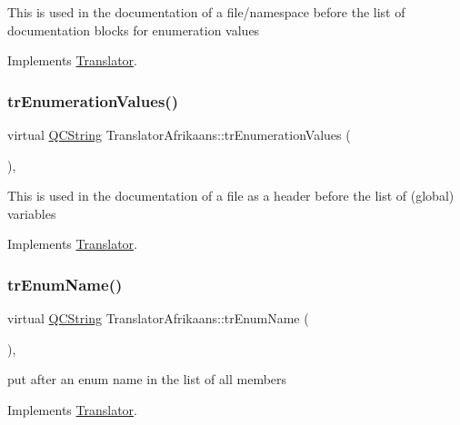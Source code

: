 This is used in the documentation of a file/namespace before the list of documentation blocks for enumeration values 

Implements \mbox{\hyperlink{class_translator}{Translator}}.

\mbox{\label{class_translator_afrikaans_a166b606d30663510308f54a4270107b7}} 
\subsubsection{\texorpdfstring{trEnumerationValues()}{trEnumerationValues()}}
{\footnotesize\ttfamily virtual \mbox{\hyperlink{class_q_c_string}{Q\+C\+String}} Translator\+Afrikaans\+::tr\+Enumeration\+Values (\begin{DoxyParamCaption}{ }\end{DoxyParamCaption})\hspace{0.3cm}{\ttfamily [inline]}, {\ttfamily [virtual]}}

This is used in the documentation of a file as a header before the list of (global) variables 

Implements \mbox{\hyperlink{class_translator}{Translator}}.

\mbox{\label{class_translator_afrikaans_a2d5b616002bc46bc02d75acfe8cec07e}} 
\subsubsection{\texorpdfstring{trEnumName()}{trEnumName()}}
{\footnotesize\ttfamily virtual \mbox{\hyperlink{class_q_c_string}{Q\+C\+String}} Translator\+Afrikaans\+::tr\+Enum\+Name (\begin{DoxyParamCaption}{ }\end{DoxyParamCaption})\hspace{0.3cm}{\ttfamily [inline]}, {\ttfamily [virtual]}}

put after an enum name in the list of all members 

Implements \mbox{\hyperlink{class_translator}{Translator}}.

\mbox{\label{class_translator_afrikaans_a5859c8e196334c48f261c032670993dd}} 
